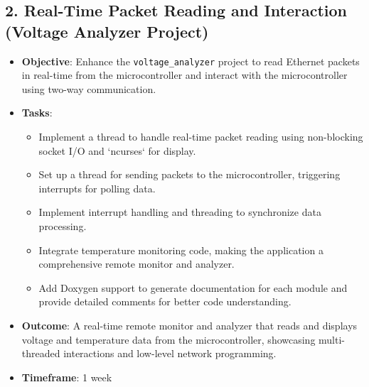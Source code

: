 \documentclass[a4paper,10pt]{article}
\begin{document}
\subsection*{2. Real-Time Packet Reading and Interaction (Voltage Analyzer Project)}
\begin{itemize}
    \item \textbf{Objective}: Enhance the \texttt{voltage\_analyzer} project to read Ethernet packets in real-time from the microcontroller and interact with the microcontroller using two-way communication.
    \item \textbf{Tasks}:
    \begin{itemize}
        \item Implement a thread to handle real-time packet reading using non-blocking socket I/O and `ncurses` for display.
        \item Set up a thread for sending packets to the microcontroller, triggering interrupts for polling data.
        \item Implement interrupt handling and threading to synchronize data processing.
        \item Integrate temperature monitoring code, making the application a comprehensive remote monitor and analyzer.
        \item Add Doxygen support to generate documentation for each module and provide detailed comments for better code understanding.
    \end{itemize}
    \item \textbf{Outcome}: A real-time remote monitor and analyzer that reads and displays voltage and temperature data from the microcontroller, showcasing multi-threaded interactions and low-level network programming.
    \item \textbf{Timeframe}: 1 week
\end{itemize}
\end{document}
